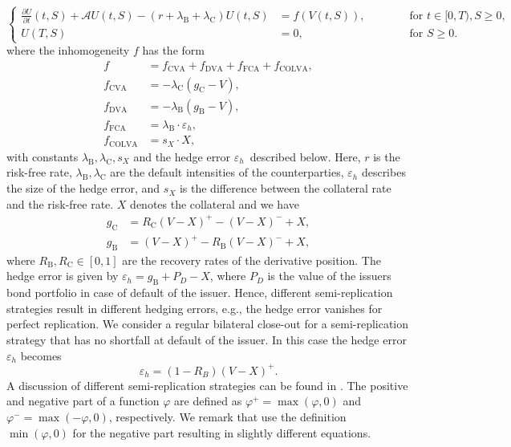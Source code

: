 \documentclass[a4paper,10pt]{article}
\newcommand{\1}{\mathbf{1}}
\begin{document}
\begin{equation}
\left\{
\begin{aligned}
\frac{\partial U}{\partial t}(t,S) + \mathcal{A}U(t,S) - (r+\lambda_\text{B}+\lambda_\text{C})U(t,S) 
&= f(V(t,S)), &&\qquad\text{ for } t\in[0,T), S\geq 0, \label{e:PDE_U} \\
U(T,S) &= 0, &&\qquad\text{ for } S\geq 0.
\end{aligned}
\right.
\end{equation}
where the inhomogeneity $f$ has the form
\begin{align*}
f &= f_\text{CVA} + f_\text{DVA} + f_\text{FCA} + f_\text{COLVA}, \\
f_\text{CVA} &= -\lambda_\text{C}(g_\text{C}-V), \\
f_\text{DVA} &= -\lambda_\text{B}(g_\text{B}-V), \\
f_\text{FCA} &= \lambda_\text{B} \cdot \varepsilon_h, \\ 
f_\text{COLVA} &= s_X \cdot X,
\end{align*}
with constants $\lambda_\text{B},\lambda_\text{C},s_X$ and the hedge error $\varepsilon_h$ described below. Here, $r$ is the risk-free rate, $\lambda_\text{B},\lambda_\text{C}$ are the default intensities of the counterparties, $\varepsilon_h$ describes the size of the hedge error, and $s_X$ is the difference between the collateral rate and the risk-free rate. $X$ denotes the collateral and we have
\begin{align*}
g_\text{C} &= R_\text{C}(V-X)^{+}-(V-X)^{-}+X,\\
g_\text{B} &= (V-X)^{+}-R_\text{B}(V-X)^{-}+X, 
\end{align*}
where $R_\text{B},R_\text{C}\in[0,1]$ are the recovery rates of the derivative position. The hedge error is given by $\varepsilon_h=g_\text{B}+P_D-X$, where $P_D$ is the value of the issuers bond portfolio in case of default of the issuer. Hence, different semi-replication strategies result in different hedging errors, e.g., the hedge error vanishes for perfect replication. We consider a regular bilateral close-out for a semi-replication strategy that has no shortfall at default of the issuer. In this case the hedge error $\varepsilon_h$ becomes
\begin{equation}\label{e:varepsilon}
\varepsilon_h=(1-R_B)(V-X)^+.
\end{equation}
A discussion of different semi-replication strategies can be found in \cite{BurgardKjaer13}. The positive and negative part of a function $\varphi$ are defined as $\varphi^+=\max(\varphi,0)$ and $\varphi^-=\max(-\varphi,0)$, respectively. We remark that \cite{BurgardKjaer13} use the definition $\min(\varphi,0)$ for the negative part resulting in slightly different equations.\\\\
\end{document}

